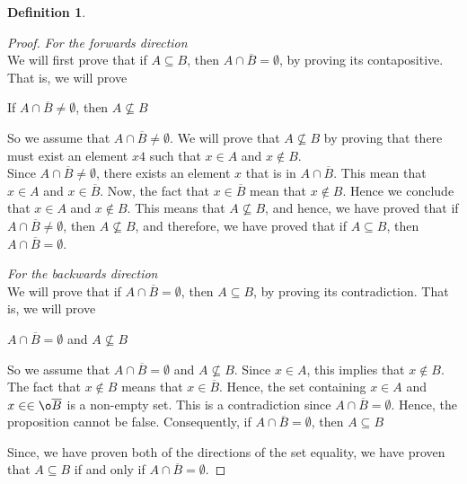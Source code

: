 \documentclass{book}
\theoremstyle{definition}
\newtheorem{definition}{Definition}[section]
\theoremstyle{remark}
\begin{document}
\begin{definition}
\begin{proof}
            \textit{For the forwards direction} \\
                We will first prove that if $A \subseteq B$, then $A \cap \overline{B} = \emptyset$, by proving its contapositive. That is, we will prove
                    \begin{center}
                        If $A \cap \overline{B} \neq \emptyset$, then $A \nsubseteq B$
                    \end{center}
                
                So we assume that $A \cap \overline{B} \neq \emptyset$. We will prove that $A \nsubseteq B$ by proving that there must exist an element $x4$ such that $x \in A$ and $x \notin B$. \\
                
                Since $A \cap \overline{B} \neq \emptyset$, there exists an element $x$ that is in $A \cap \overline{B}$. This mean that $x \in A$ and $x \in \overline{B}$. Now, the fact that $x \in \overline{B}$ mean that $x \notin B$. Hence we conclude that $x \in A$ and $x \notin B$. This means that $A \nsubseteq B$, and hence, we have proved that if $A \cap \overline{B} \neq \emptyset$, then $A \nsubseteq B$, and therefore, we have proved that if $A \subseteq B$, then $A \cap \overline{B} = \emptyset$. 
            
            \textit{For the backwards direction} \\ 
                We will prove that if $A \cap \overline{B} = \emptyset$, then $A \subseteq B$, by proving its contradiction. That is, we will prove
                    \begin{center}
                        $A \cap \overline{B} = \emptyset$ and $A \nsubseteq B$
                    \end{center}
                So we assume that $A \cap \overline{B} = \emptyset$ and $A \nsubseteq B$. Since $x\in A$, this implies that $x \notin B$. The fact that $x \notin B$ means that $x \in \overline{B}$. Hence, the set containing $x \in A$ and $x \in \in \o\overline{B}$ is a non-empty set. This is a contradiction since $A \cap \overline{B} = \emptyset$. Hence, the proposition cannot be false. Consequently, if $A \cap \overline{B} = \emptyset$, then $A \subseteq B$
                
                Since, we have proven both of the directions of the set equality, we have proven that $A \subseteq B$ if and only if $A \cap \overline{B} = \emptyset$.          
        \end{proof}
\end{definition}
\end{document}

